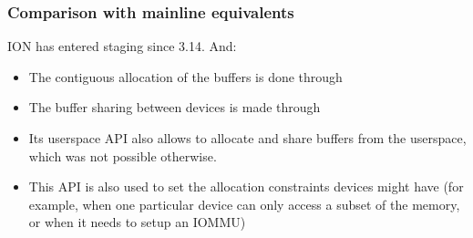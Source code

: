 \begin{frame}
  \frametitle{Comparison with mainline equivalents}
  \begin{itemize}
  ION has entered staging since 3.14. And:
    \begin{itemize}
    \item The contiguous allocation of the buffers is done through
    \item The buffer sharing between devices is made through
    \item Its userspace API also allows to allocate and share buffers
      from the userspace, which was not possible otherwise.
    \item This API is also used to set the allocation constraints
      devices might have (for example, when one particular device can
      only access a subset of the memory, or when it needs to setup an
      IOMMU)
    \end{itemize}
  \end{itemize}
\end{frame}
